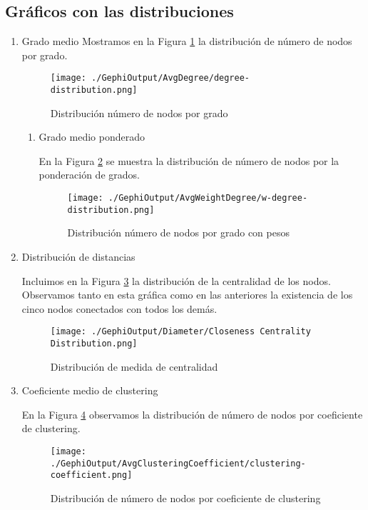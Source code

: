 \documentclass[11pt]{article}
\begin{document}
\subsection{Gráficos con las distribuciones}
\label{sec:org1bb15db}

\begin{enumerate}
\item Grado medio
\label{sec:org9f613c0}
Mostramos en la Figura \ref{fig:org520fdb0} la distribución de número de nodos
por grado.

\begin{figure}[htbp]
\centering
\texttt{[image: ./GephiOutput/AvgDegree/degree-distribution.png]}
\caption{\label{fig:org520fdb0}
Distribución número de nodos por grado}
\end{figure} 

\begin{enumerate}
\item Grado medio ponderado
\label{sec:org09ea5d4}

En la Figura \ref{fig:org618bbbe} se muestra la distribución de número de
nodos por la ponderación de grados. 

\begin{figure}[htbp]
\centering
\texttt{[image: ./GephiOutput/AvgWeightDegree/w-degree-distribution.png]}
\caption{\label{fig:org618bbbe}
Distribución número de nodos por grado con pesos}
\end{figure}
\end{enumerate}


\item Distribución de distancias
\label{sec:org0e2cc79}

Incluimos en la Figura \ref{fig:orgabd3dd8} la distribución de la
centralidad de los nodos. Observamos tanto en esta gráfica como en las
anteriores la existencia de los cinco nodos conectados con todos los
demás.

\begin{figure}[htbp]
\centering
\texttt{[image: ./GephiOutput/Diameter/Closeness Centrality Distribution.png]}
\caption{\label{fig:orgabd3dd8}
Distribución de medida de centralidad}
\end{figure}

\item Coeficiente medio de clustering
\label{sec:org26b26df}

En la Figura \ref{fig:org41cc9ee} observamos la distribución de número de
nodos por coeficiente de clustering.

\begin{figure}[htbp]
\centering
\texttt{[image: ./GephiOutput/AvgClusteringCoefficient/clustering-coefficient.png]}
\caption{\label{fig:org41cc9ee}
Distribución de número de nodos por coeficiente de clustering}
\end{figure}
\end{enumerate}
\end{document}
